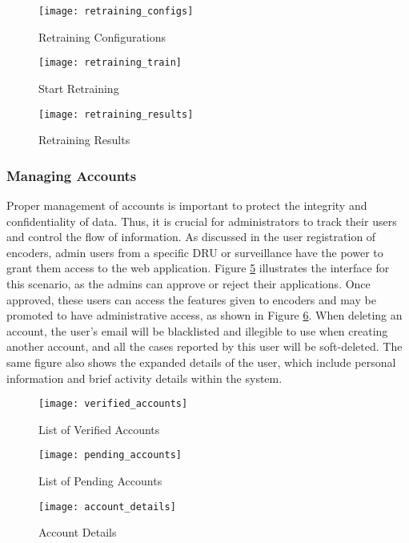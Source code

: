 \begin{figure}[H]
	\centering
	\texttt{[image: retraining\_configs]}
	\caption{Retraining Configurations}
	\label{fig:retraining_configs}
\end{figure}
\begin{figure}[H]
	\centering
	\texttt{[image: retraining\_train]}
	\caption{Start Retraining}
	\label{fig:retraining_train}
\end{figure}
\begin{figure}[H]
	\centering
	\texttt{[image: retraining\_results]}
	\caption{Retraining Results}
	\label{fig:retraining_results}
\end{figure}

\clearpage

\subsubsection{Managing Accounts}

Proper management of accounts is important to protect the integrity and confidentiality of data. Thus, it is crucial for administrators to track their users and control the flow of information. As discussed in the user registration of encoders, admin users from a specific DRU or surveillance have the power to grant them access to the web application. Figure \ref{fig:pending_accounts} illustrates the interface for this scenario, as the admins can approve or reject their applications. Once approved, these users can access the features given to encoders and may be promoted to have administrative access, as shown in Figure \ref{fig:account_details}. When deleting an account, the user's email will be blacklisted and illegible to use when creating another account, and all the cases reported by this user will be soft-deleted. The same figure also shows the expanded details of the user, which include personal information and brief activity details within the system.

\begin{figure}[H]
	\centering
	\texttt{[image: verified\_accounts]}
	\caption{List of Verified Accounts}
	\label{fig:verified_accounts}
\end{figure}
\begin{figure}[H]
	\centering
	\texttt{[image: pending\_accounts]}
	\caption{List of Pending Accounts}
	\label{fig:pending_accounts}
\end{figure}
\begin{figure}[H]
	\centering
	\texttt{[image: account\_details]}
	\caption{Account Details}
	\label{fig:account_details}
\end{figure}

